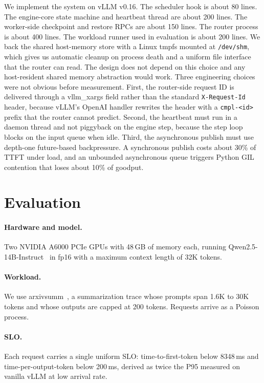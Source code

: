We implement the system on vLLM v0.16. The scheduler hook is about 80 lines. The engine-core state machine and heartbeat thread are about 200 lines. The worker-side checkpoint and restore RPCs are about 150 lines. The router process is about 400 lines. The workload runner used in evaluation is about 200 lines. We back the shared host-memory store with a Linux tmpfs mounted at \texttt{/dev/shm}, which gives us automatic cleanup on process death and a uniform file interface that the router can read. The design does not depend on this choice and any host-resident shared memory abstraction would work. Three engineering choices were not obvious before measurement. First, the router-side request ID is delivered through a vllm\_xargs field rather than the standard \texttt{X-Request-Id} header, because vLLM's OpenAI handler rewrites the header with a \texttt{cmpl-\textless{}id\textgreater} prefix that the router cannot predict. Second, the heartbeat must run in a daemon thread and not piggyback on the engine step, because the step loop blocks on the input queue when idle. Third, the asynchronous publish must use depth-one future-based backpressure. A synchronous publish costs about 30\% of TTFT under load, and an unbounded asynchronous queue triggers Python GIL contention that loses about 10\% of goodput.

\section{Evaluation}

\paragraph{Hardware and model.}
Two NVIDIA A6000 PCIe GPUs with 48\,GB of memory each, running Qwen2.5-14B-Instruct~\cite{qwen25} in fp16 with a maximum context length of 32K tokens.

\paragraph{Workload.}
We use arxivsumm~\cite{cohan2018arxiv}, a summarization trace whose prompts span 1.6K to 30K tokens and whose outputs are capped at 200 tokens. Requests arrive as a Poisson process.

\paragraph{SLO.}
Each request carries a single uniform SLO: time-to-first-token below 8348\,ms and time-per-output-token below 200\,ms, derived as twice the P95 measured on vanilla vLLM at low arrival rate.

